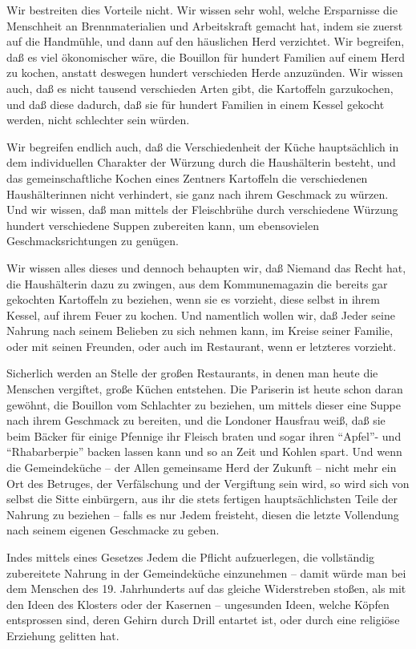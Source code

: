 \documentclass{scrbook}
\begin{document}
Wir bestreiten dies Vorteile nicht. Wir wissen sehr wohl, welche Ersparnisse die Menschheit an Brennmaterialien und Arbeitskraft gemacht hat, indem sie zuerst auf die Handmühle, und dann auf den häuslichen Herd verzichtet. Wir begreifen, daß es viel ökonomischer wäre, die Bouillon für hundert Familien auf einem Herd zu kochen, anstatt deswegen hundert verschieden Herde anzuzünden. Wir wissen auch, daß es nicht tausend verschieden Arten gibt, die Kartoffeln garzukochen, und daß diese dadurch, daß sie für hundert Familien in einem Kessel gekocht werden, nicht schlechter sein würden.

Wir begreifen endlich auch, daß die Verschiedenheit der Küche hauptsächlich in dem individuellen Charakter der Würzung durch die Haushälterin besteht, und das gemeinschaftliche Kochen eines Zentners Kartoffeln die verschiedenen Haushälterinnen nicht verhindert, sie ganz nach ihrem Geschmack zu würzen. Und wir wissen, daß man mittels der Fleischbrühe durch verschiedene Würzung hundert verschiedene Suppen zubereiten kann, um ebensovielen Geschmacksrichtungen zu genügen.

Wir wissen alles dieses und dennoch behaupten wir, daß Niemand das Recht hat, die Haushälterin dazu zu zwingen, aus dem Kommunemagazin die bereits gar gekochten Kartoffeln zu beziehen, wenn sie es vorzieht, diese selbst in ihrem Kessel, auf ihrem Feuer zu kochen. Und namentlich wollen wir, daß Jeder seine Nahrung nach seinem Belieben zu sich nehmen kann, im Kreise seiner Familie, oder mit seinen Freunden, oder auch im Restaurant, wenn er letzteres vorzieht.

Sicherlich werden an Stelle der großen Restaurants, in denen man heute die Menschen vergiftet, große Küchen entstehen. Die Pariserin ist heute schon daran gewöhnt, die Bouillon vom Schlachter zu beziehen, um mittels dieser eine Suppe nach ihrem Geschmack zu bereiten, und die Londoner Hausfrau weiß, daß sie beim Bäcker für einige Pfennige ihr Fleisch braten und sogar ihren ``Apfel''- und ``Rhabarberpie'' backen lassen kann und so an Zeit und Kohlen spart. Und wenn die Gemeindeküche – der Allen gemeinsame Herd der Zukunft – nicht mehr ein Ort des Betruges, der Verfälschung und der Vergiftung sein wird, so wird sich von selbst die Sitte einbürgern, aus ihr die stets fertigen hauptsächlichsten Teile der Nahrung zu beziehen – falls es nur Jedem freisteht, diesen die letzte Vollendung nach seinem eigenen Geschmacke zu geben.

Indes mittels eines Gesetzes Jedem die Pflicht aufzuerlegen, die vollständig zubereitete Nahrung in der Gemeindeküche einzunehmen – damit würde man bei dem Menschen des 19. Jahrhunderts auf das gleiche Widerstreben stoßen, als mit den Ideen des Klosters oder der Kasernen – ungesunden Ideen, welche Köpfen entsprossen sind, deren Gehirn durch Drill entartet ist, oder durch eine religiöse Erziehung gelitten hat.
\end{document}
